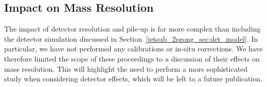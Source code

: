 \documentclass[11pt]{cernrep}
\begin{document}


%



% 


\subsection{Impact on Mass Resolution}\label{jetsub_2prong_sec:detector_robust}

The impact of detector resolution and pile-up is far more complex than
including the detector simulation discussed in
Section~\ref{jetsub_2prong_sec:det_model}.
%
In particular, we have not performed any calibrations or in-situ
corrections.
%
We have therefore limited the scope of these proceedings to a
discussion of their effects on mass resolution.
% 
%
This will highlight the need to perform a more sophisticated study
when considering detector effects, which will be left to a future
publication.
\end{document}
